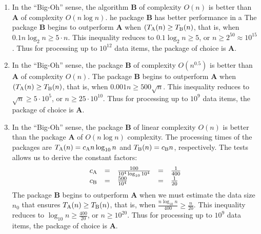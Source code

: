 \documentclass[]{article}
\begin{document}
\begin{enumerate}
\item In the ``Big-Oh'' sense, the algorithm {\bf B} of complexity
$O(n)$ is better than {\bf A} of complexity $O(n \log n)$.
he package {\bf B} has better performance in a 
The package {\bf B} begins to outperform {\bf A} when
$(T_{\rm A}(n) \ge T_{\rm B}(n)$, that is, when
$0.1n \log_{2} n \ge 5 \cdot n$. This inequality reduces to
$0.1 \log_{2}n \ge 5$, or $n \ge 2^{50}\approx
10^{15}$. Thus for processing up to
$10^{12}$ data items, the package of choice is {\bf A}.

\item
In the ``Big-Oh'' sense, the package {\bf B} of complexity
$O(n^{0.5})$ is better than {\bf A} of complexity $O(n)$.
The package {\bf B} begins to outperform {\bf A} when
$(T_{\rm A}(n) \ge T_{\rm B}(n)$, that is, when
$0.001n \ge 500\sqrt{n}$. This inequality reduces to
$\sqrt{n} \ge 5\cdot 10^{5}$, or $n \ge 25 \cdot 10^{10}$. 
Thus for processing up to
$10^{9}$ data items, the package of choice is {\bf A}.

\item 
In the ``Big-Oh'' sense, the package {\bf B} of linear
complexity $O(n)$ is better than the package {\bf A} of
$O(n\log n)$ complexity.
The processing times of the
packages are $T_{\rm A}(n) = c_{\rm A}n \log_{10} n$
and $T_{\rm B}(n) = c_{\rm B} n$, respectively. 
The tests allows us to derive the constant factors:
\[
\begin{array}{lllll}
c_{\rm A} & = & \frac{100}{10^{4}\log_{10} 10^{4}} & = 
& \frac{1}{400}\\
c_{\rm B} & = & \frac{500}{10^{4}} & = & \frac{1}{20}
\end{array}
\]
The package {\bf B} begins to outperform {\bf A} when
we must estimate the data size $n_{0}$ that ensures
$T_{\rm A}(n) \ge T_{\rm B}(n)$, that is, when
$ \frac{n \log_{10} n}{400} \ge \frac{n}{20}$. This
inequality reduces to $\log_{10} n \ge \frac{400}{20}$, or 
$n \ge 10^{20}$. Thus for processing up to
$10^{9}$ data items, the package of choice is {\bf A}.


\end{enumerate}
\end{document}
